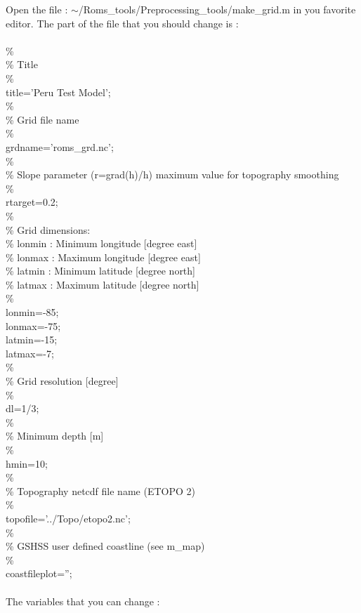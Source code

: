 Open the file : $\sim$/Roms\_tools/Preprocessing\_tools/make\_grid.m in 
you favorite editor. The part of the file that you should change is :
\\ \\
\%\\
\%  Title\\ 
\%\\
title='Peru Test Model';\\
\%\\
\%  Grid file name\\
\%\\
grdname='roms\_grd.nc';\\
\%\\
\% Slope parameter (r=grad(h)/h) maximum value for topography smoothing\\
\%\\
rtarget=0.2;\\
\%\\
\% Grid dimensions:\\
\%   lonmin : Minimum longitude [degree east]\\
\%   lonmax : Maximum longitude [degree east]\\
\%   latmin : Minimum latitude [degree north]\\
\%   latmax : Maximum latitude [degree north]\\
\%\\
lonmin=-85;\\
lonmax=-75;\\
latmin=-15;\\
latmax=-7;\\
\%\\
\% Grid resolution [degree]\\
\%\\
dl=1/3;\\
\%\\
\% Minimum depth [m]\\
\%\\
hmin=10;\\
\%\\
\%  Topography netcdf file name (ETOPO 2)\\
\%\\
topofile='../Topo/etopo2.nc';\\
\%\\
\%  GSHSS user defined coastline (see m\_map) \\
\%\\
coastfileplot='';\\
\\
The variables that you can change :
